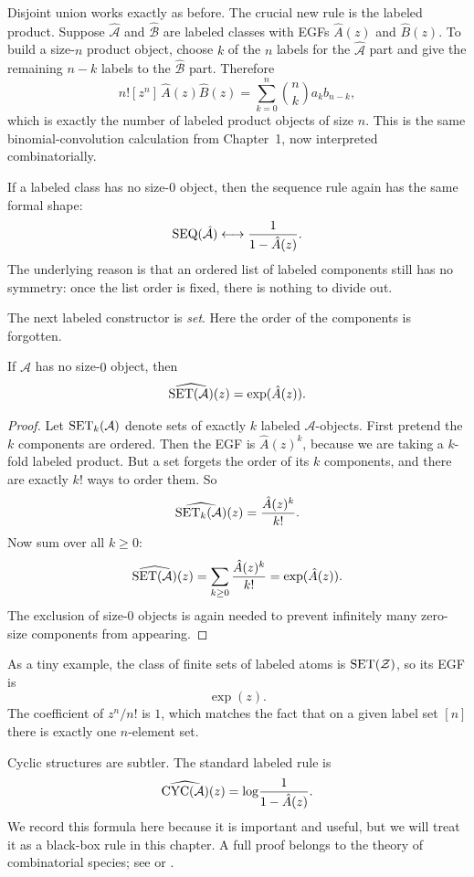 Disjoint union works exactly as before. The crucial new rule is the labeled product. Suppose $\hat{\mathcal{A}}$ and $\hat{\mathcal{B}}$ are labeled classes with EGFs $\hat{A}(z)$ and $\hat{B}(z)$. To build a size-$n$ product object, choose $k$ of the $n$ labels for the $\hat{\mathcal{A}}$ part and give the remaining $n-k$ labels to the $\hat{\mathcal{B}}$ part. Therefore
\[
  n![z^n]\,\hat{A}(z)\hat{B}(z)
  = \sum_{k=0}^n \binom{n}{k} a_k b_{n-k},
\]
which is exactly the number of labeled product objects of size $n$. This is the same binomial-convolution calculation from Chapter~1, now interpreted combinatorially.

If a labeled class has no size-$0$ object, then the sequence rule again has the same formal shape:
\[
  \operatorname{SEQ}(\hat{\mathcal{A}}) \longleftrightarrow \frac{1}{1-\hat{A}(z)}.
\]
The underlying reason is that an ordered list of labeled components still has no symmetry: once the list order is fixed, there is nothing to divide out.

The next labeled constructor is \emph{set}. Here the order of the components is forgotten.

\begin{proposition}
If $\hat{\mathcal{A}}$ has no size-$0$ object, then
\[
  \widehat{\operatorname{SET}(\mathcal{A})}(z) = \exp(\hat{A}(z)).
\]
\end{proposition}

\begin{proof}
Let $\operatorname{SET}_k(\mathcal{A})$ denote sets of exactly $k$ labeled $\mathcal{A}$-objects. First pretend the $k$ components are ordered. Then the EGF is $\hat{A}(z)^k$, because we are taking a $k$-fold labeled product. But a set forgets the order of its $k$ components, and there are exactly $k!$ ways to order them. So
\[
  \widehat{\operatorname{SET}_k(\mathcal{A})}(z) = \frac{\hat{A}(z)^k}{k!}.
\]
Now sum over all $k \ge 0$:
\[
  \widehat{\operatorname{SET}(\mathcal{A})}(z)
  = \sum_{k \ge 0} \frac{\hat{A}(z)^k}{k!}
  = \exp(\hat{A}(z)).
\]
The exclusion of size-$0$ objects is again needed to prevent infinitely many zero-size components from appearing.
\end{proof}

As a tiny example, the class of finite sets of labeled atoms is $\operatorname{SET}(\mathcal{Z})$, so its EGF is
\[
  \exp(z).
\]
The coefficient of $z^n/n!$ is $1$, which matches the fact that on a given label set $[n]$ there is exactly one $n$-element set.

Cyclic structures are subtler. The standard labeled rule is
\[
  \widehat{\operatorname{CYC}(\mathcal{A})}(z) = \log\!\frac{1}{1-\hat{A}(z)}.
\]
We record this formula here because it is important and useful, but we will treat it as a black-box rule in this chapter. A full proof belongs to the theory of combinatorial species; see \cite{BergeronLabelleLeRoux1998} or \cite{FlajoletSedgewick2009}.

